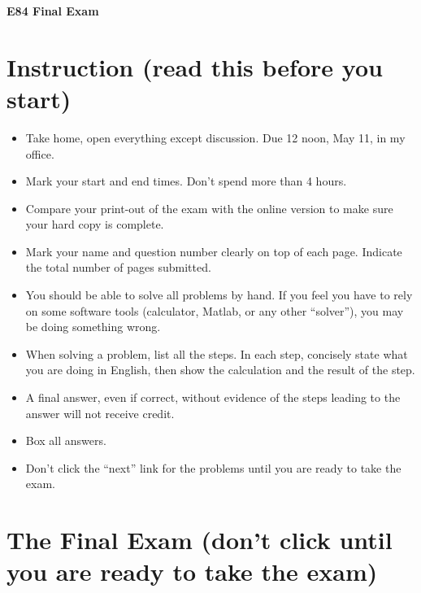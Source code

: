 \usepackage{html}

\begin{center}
{\Large \bf E84 Final Exam}
\end{center}

\section*{Instruction (read this before you start)}

\begin{itemize}
\item Take home, open everything except discussion. Due 12 noon, May 11,
  in my office.
\item Mark your start and end times. Don't spend more than 4 hours.
\item Compare your print-out of the exam with the online version to make 
  sure your hard copy is complete.
\item Mark your name and question number clearly on top of each page.
  Indicate the total number of pages submitted.
\item You should be able to solve all problems by hand. If you feel you 
  have to rely on some software tools (calculator, Matlab, or any other
  ``solver''), you may be doing something wrong.
\item When solving a problem, list all the steps. In each step, concisely
  state what you are doing in English, then show the calculation and the 
  result of the step. 
\item A final answer, even if correct, without evidence of the steps 
  leading to the answer will not receive credit.
\item Box all answers.
\item Don't click the ``next'' link for the problems until you are ready 
  to take the exam.
\end{itemize}

\section*{The Final Exam (don't click until you are ready to take the exam)}

